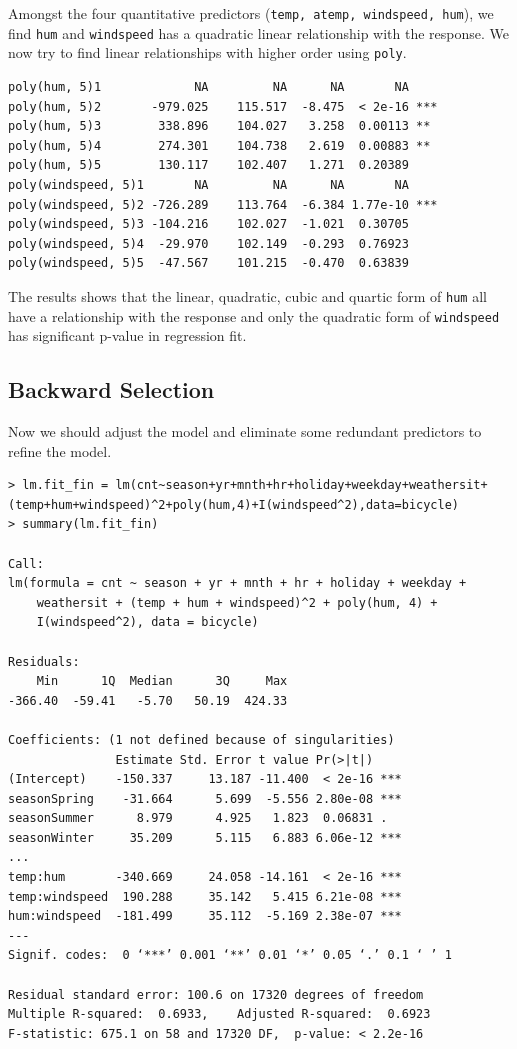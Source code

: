 Amongst the four quantitative predictors (\texttt{temp, atemp, windspeed, hum}), we find \texttt{hum} and \texttt{windspeed} has a quadratic linear relationship with the response. We now try to find linear relationships with higher order using \texttt{poly}.
\begin{lstlisting}[style=rlanguage]
poly(hum, 5)1             NA         NA      NA       NA
poly(hum, 5)2       -979.025    115.517  -8.475  < 2e-16 ***
poly(hum, 5)3        338.896    104.027   3.258  0.00113 **
poly(hum, 5)4        274.301    104.738   2.619  0.00883 **
poly(hum, 5)5        130.117    102.407   1.271  0.20389
poly(windspeed, 5)1       NA         NA      NA       NA
poly(windspeed, 5)2 -726.289    113.764  -6.384 1.77e-10 ***
poly(windspeed, 5)3 -104.216    102.027  -1.021  0.30705
poly(windspeed, 5)4  -29.970    102.149  -0.293  0.76923
poly(windspeed, 5)5  -47.567    101.215  -0.470  0.63839
\end{lstlisting}
The results shows that the linear, quadratic, cubic and quartic form of \texttt{hum} all have a relationship with the response and only the quadratic form of \texttt{windspeed} has significant p-value in regression fit.

\subsection{Backward Selection}
Now we should adjust the model and eliminate some redundant predictors to refine the model.
\begin{lstlisting}[style=rlanguage]
> lm.fit_fin = lm(cnt~season+yr+mnth+hr+holiday+weekday+weathersit+(temp+hum+windspeed)^2+poly(hum,4)+I(windspeed^2),data=bicycle)
> summary(lm.fit_fin)

Call:
lm(formula = cnt ~ season + yr + mnth + hr + holiday + weekday +
    weathersit + (temp + hum + windspeed)^2 + poly(hum, 4) +
    I(windspeed^2), data = bicycle)

Residuals:
    Min      1Q  Median      3Q     Max
-366.40  -59.41   -5.70   50.19  424.33

Coefficients: (1 not defined because of singularities)
               Estimate Std. Error t value Pr(>|t|)
(Intercept)    -150.337     13.187 -11.400  < 2e-16 ***
seasonSpring    -31.664      5.699  -5.556 2.80e-08 ***
seasonSummer      8.979      4.925   1.823  0.06831 .
seasonWinter     35.209      5.115   6.883 6.06e-12 ***
...
temp:hum       -340.669     24.058 -14.161  < 2e-16 ***
temp:windspeed  190.288     35.142   5.415 6.21e-08 ***
hum:windspeed  -181.499     35.112  -5.169 2.38e-07 ***
---
Signif. codes:  0 ‘***’ 0.001 ‘**’ 0.01 ‘*’ 0.05 ‘.’ 0.1 ‘ ’ 1

Residual standard error: 100.6 on 17320 degrees of freedom
Multiple R-squared:  0.6933,	Adjusted R-squared:  0.6923
F-statistic: 675.1 on 58 and 17320 DF,  p-value: < 2.2e-16
\end{lstlisting}


